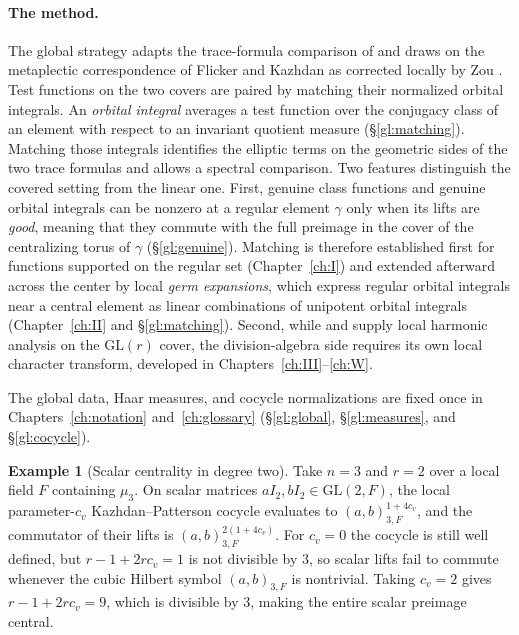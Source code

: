 \documentclass[12pt,letterpaper,oneside]{book}
\theoremstyle{plain}
\theoremstyle{definition}
\newtheorem{example}[theorem]{Example}
\begin{document}
\paragraph{The method.} The global strategy adapts the trace-formula comparison of \cite{JL70} and draws on the metaplectic correspondence of Flicker and Kazhdan \cite{FK86} as corrected locally by Zou \cite{Zo23}. Test functions on the two covers are paired by matching their normalized orbital integrals. An \emph{orbital integral} averages a test function over the conjugacy class of an element with respect to an invariant quotient measure (\S\ref{gl:matching}). Matching those integrals identifies the elliptic terms on the geometric sides of the two trace formulas and allows a spectral comparison. Two features distinguish the covered setting from the linear one. First, genuine class functions and genuine orbital integrals can be nonzero at a regular element $\gamma$ only when its lifts are \emph{good}, meaning that they commute with the full preimage in the cover of the centralizing torus of $\gamma$ (\S\ref{gl:genuine}). Matching is therefore established first for functions supported on the regular set (Chapter~\ref{ch:I}) and extended afterward across the center by local \emph{germ expansions}, which express regular orbital integrals near a central element as linear combinations of unipotent orbital integrals (Chapter~\ref{ch:II} and \S\ref{gl:matching}). Second, while \cite{FK86} and \cite{Zo23} supply local harmonic analysis on the $\mathrm{GL}(r)$ cover, the division-algebra side requires its own local character transform, developed in Chapters~\ref{ch:III}--\ref{ch:W}.

The global data, Haar measures, and cocycle normalizations are fixed once in Chapters~\ref{ch:notation} and~\ref{ch:glossary} (\S\ref{gl:global}, \S\ref{gl:measures}, and \S\ref{gl:cocycle}).

\begin{example}[Scalar centrality in degree two]\label{ex:intro-centrality}
Take $n=3$ and $r=2$ over a local field $F$ containing $\mu_3$. On scalar matrices $aI_2, bI_2 \in \mathrm{GL}(2,F)$, the local parameter-$c_v$ Kazhdan--Patterson cocycle evaluates to $(a,b)_{3,F}^{1+4c_v}$, and the commutator of their lifts is $(a,b)_{3,F}^{2(1+4c_v)}$. For $c_v=0$ the cocycle is still well defined, but $r-1+2rc_v = 1$ is not divisible by $3$, so scalar lifts fail to commute whenever the cubic Hilbert symbol $(a,b)_{3,F}$ is nontrivial. Taking $c_v=2$ gives $r-1+2rc_v = 9$, which is divisible by $3$, making the entire scalar preimage central.
\end{example}
\end{document}
